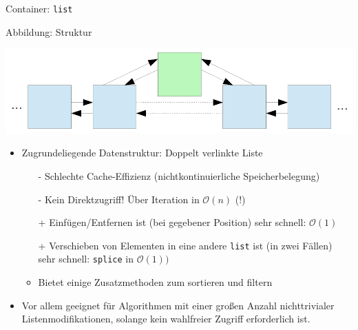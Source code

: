 \begin{frame}[fragile]{Container: \texttt{list}}
	\begin{block}{Abbildung: Struktur}
		\begin{center}
			\includegraphics[width=0.6\linewidth]{images/list.pdf}
		\end{center}
	\end{block}

	\begin{itemize}
		\item Zugrundeliegende Datenstruktur: Doppelt verlinkte Liste
		\pause
		\begin{itemize}
			\item[-] Schlechte Cache-Effizienz (nichtkontinuierliche Speicherbelegung)
			\item[-] Kein Direktzugriff! Über Iteration in $\mathcal{O}(n)$ (!)
			\pause
			\item[+] Einfügen/Entfernen ist (bei gegebener Position) sehr schnell: $\mathcal{O}(1)$
			\item[+] Verschieben von Elementen in eine andere \verb|list| ist (in zwei Fällen) sehr schnell: \verb|splice| in $\mathcal{O}(1))$
			\item Bietet einige Zusatzmethoden zum sortieren und filtern
		\end{itemize}
		\pause
		\item Vor allem geeignet für Algorithmen mit einer großen Anzahl nichttrivialer Listenmodifikationen, solange kein wahlfreier Zugriff erforderlich ist.
	\end{itemize}
\end{frame}

